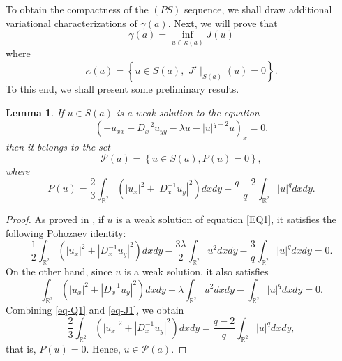 \documentclass[11pt]{amsart}
\newtheorem{lemma}[theorem]{Lemma}
\numberwithin{equation}{section}
\begin{document}
{{{To obtain the compactness of the $ (PS) $ sequence, we shall draw additional variational
characterizations of $\gamma(a)$. Next, we will prove that
$$
\gamma(a)=\inf _{u \in \kappa(a)}J(u)
$$
{where
    $$
    \kappa(a)=\left\{u \in S(a), \,\,J'\mid_{ S(a)}(u)=0\right\}.
    $$}
To this end, we shall present some preliminary results.
\begin{lemma}\label{Lem-poh}
    If $u\in S(a)$ is a weak solution to the equation
    \begin{equation}\label{EQ1}
        \left(-u_{x x}+D_x^{-2} u_{y y}-\lambda u-|u|^{q-2}u\right)_x=0.
    \end{equation}
    then it belongs to the set
    \begin{equation}
        \mathcal{P}(a)=\left\{u \in S(a),P(u)=0\right\},
    \end{equation}
    where
    \begin{equation}
        P(u)=\frac{2}{3}\int_{\mathbb{R}^{2}}\left( |u_{x}|^{2} +|D^{-1}_{x} u_{y}|^{2}\right) dx dy-\frac{q-2}{q}\int_{\mathbb{R}^2} |u|^qdxdy.
    \end{equation}
\end{lemma}
\begin{proof}
    {As proved in \cite[Lemma 2.3]{AGM},}
    if $u$ is a weak solution of equation \eqref{EQ1}, it satisfies the following Pohozaev identity:
    \begin{equation}\label{eq-Q1}
        \frac{1}{2}\int_{\mathbb{R}^{2}}\left( |u_{x}|^{2}+|D^{-1}_{x} u_{y}|^{2} \right)dx dy-\frac{3\lambda}{2}\int_{\mathbb{R}^{2}} u^2dxdy-\frac{3}{q}\int_{\mathbb{R}^{2}} |u|^qdxdy=0 .
    \end{equation}
    On the other hand, since $u$ is a weak solution, it also satisfies
    \begin{equation}\label{eq-J1}
        \int_{\mathbb{R}^{2}}\left( |u_{x}|^{2}+|D^{-1}_{x} u_{y}|^{2} \right)dx dy-\lambda \int_{\mathbb{R}^{2}} u^2dxdy-\int_{\mathbb{R}^{2}} |u|^qdxdy =0.
    \end{equation}
    Combining \eqref{eq-Q1} and \eqref{eq-J1}, we obtain
 $$
    \frac{2}{3}\int_{\mathbb{R}^{2}}\left( |u_{x}|^{2} +|D^{-1}_{x} u_{y}|^{2}\right) dx dy=\frac{q-2}{q}\int_{\mathbb{R}^2} |u|^qdxdy,
    $$
   that is, $P(u)=0$. Hence, $u\in \mathcal{P}(a)$.

\end{proof}}}}
\end{document}
